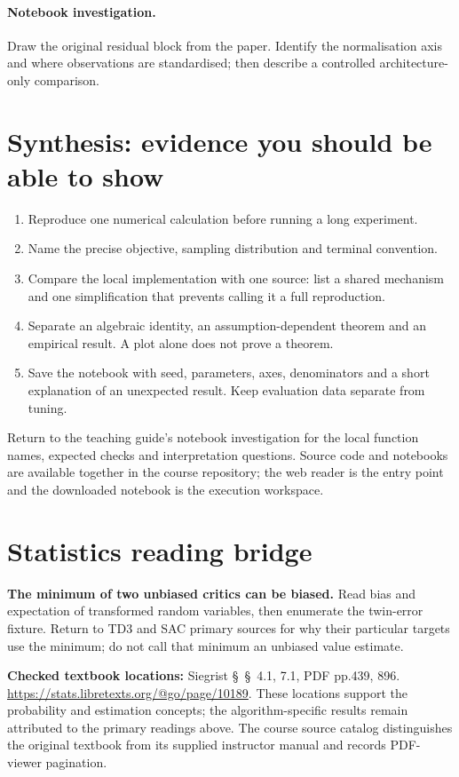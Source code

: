\documentclass[11pt]{scrartcl}
\begin{document}
\paragraph{Notebook investigation.} Draw the original residual block from the paper. Identify the normalisation axis and where observations are standardised; then describe a controlled architecture-only comparison.

\section*{Synthesis: evidence you should be able to show}
\begin{enumerate}
\item Reproduce one numerical calculation before running a long experiment.
\item Name the precise objective, sampling distribution and terminal convention.
\item Compare the local implementation with one source: list a shared mechanism
and one simplification that prevents calling it a full reproduction.
\item Separate an algebraic identity, an assumption-dependent theorem and an
empirical result. A plot alone does not prove a theorem.
\item Save the notebook with seed, parameters, axes, denominators and a short
explanation of an unexpected result. Keep evaluation data separate from tuning.
\end{enumerate}
Return to the teaching guide's notebook investigation for the local function
names, expected checks and interpretation questions. Source code and notebooks
are available together in the course repository; the web reader is the entry
point and the downloaded notebook is the execution workspace.
\section*{Statistics reading bridge}
\textbf{The minimum of two unbiased critics can be biased.} Read bias and expectation of transformed random variables, then enumerate the twin-error fixture. Return to TD3 and SAC primary sources for why their particular targets use the minimum; do not call that minimum an unbiased value estimate.

\textbf{Checked textbook locations:} Siegrist \S~\S~4.1, 7.1, PDF pp.439, 896. \url{https://stats.libretexts.org/@go/page/10189}. These locations support the probability and estimation concepts; the algorithm-specific results remain attributed to the primary readings above. The course source catalog distinguishes the original textbook from its supplied instructor manual and records PDF-viewer pagination.
\end{document}
